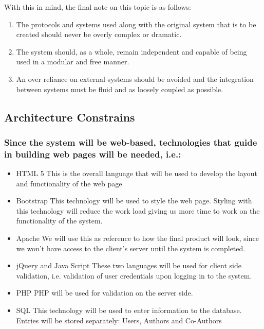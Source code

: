 \documentclass[hidelinks,a4paper,12pt]{article}
\begin{document}
	With this in mind, the final note on this topic is as follows: 
	\begin{enumerate}
		\item The protocols and systems used along with the original system that is to be created should never be overly complex or dramatic. 
		\item The system should, as a whole, remain independent and capable of being used in a modular and free manner. 
		\item An over reliance on external systems should be avoided and the integration between systems must be fluid and as loosely coupled as possible.
	\end{enumerate}
	
	\subsection{Architecture Constrains}
			\subsubsection{ Since the system will be web-based, technologies that guide in building web pages will be needed, i.e.:}
		
		\begin{itemize} 
			\item HTML 5
			\newline
			This is the overall language that will be used to develop the layout and functionality of the web page
				\item Bootstrap
				\newline
			This technology will be used to style the web page. Styling with this technology will reduce the work load giving us more time to work on the 				functionality of the system.
				\item Apache
				\newline
			We will use this as reference to how the final product will look, since we won’t have access to the client’s server until the system is completed.	
				\item jQuery and Java Script
				\newline
			These two languages will be used for client side validation, i.e. validation of user credentials upon logging in to the system.	
				\item PHP
				\newline
			PHP will be used for validation on the server side.	
				\item SQL
				\newline  
			This technology will be used to enter information to the database. Entries will be stored separately:
			Users,
			Authors and Co-Authors
		\end{itemize}
		
\end{document}
